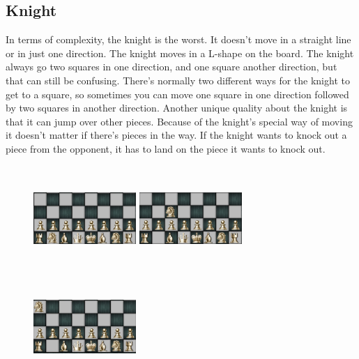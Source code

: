 \documentclass{article}
\begin{document}
\subsection*{Knight} In terms of complexity, the knight is the worst. It doesn’t move in a straight line or in just one direction. The knight moves in a L-shape on the board. The knight always go two squares in one direction, and one square another direction, but that can still be confusing. There’s normally two different ways for the knight to get to a square, so sometimes you can move one square in one direction followed by two squares in another direction. Another unique quality about the knight is that it can jump over other pieces. Because of the knight’s special way of moving it doesn’t matter if there’s pieces in the way. If the knight wants to knock out a piece from the opponent, it has to land on the piece it wants to knock out.
\begin{figure}[h]
\includegraphics[width=3.9cm, height=4cm]{knight1} \includegraphics[width=3.9cm, height=4cm]{knight2} \includegraphics[width=3.9cm, height=4cm]{knight3}
\end{figure}
\end{document}
